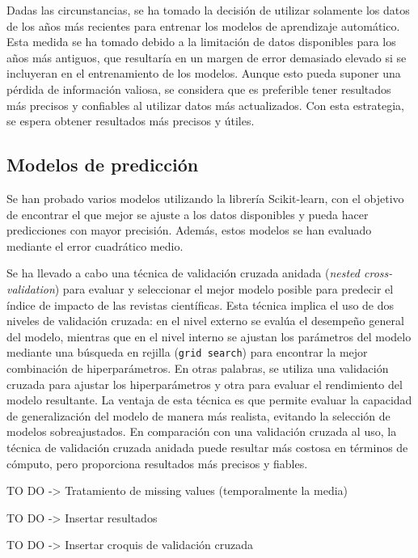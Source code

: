 Dadas las circunstancias, se ha tomado la decisión de utilizar solamente los datos de los años más recientes para entrenar los modelos de aprendizaje automático. Esta medida se ha tomado debido a la limitación de datos disponibles para los años más antiguos, que resultaría en un margen de error demasiado elevado si se incluyeran en el entrenamiento de los modelos. Aunque esto pueda suponer una pérdida de información valiosa, se considera que es preferible tener resultados más precisos y confiables al utilizar datos más actualizados. Con esta estrategia, se espera obtener resultados más precisos y útiles.

\subsection{Modelos de predicción}

Se han probado varios modelos utilizando la librería Scikit-learn, con el objetivo de encontrar el que mejor se ajuste a los datos disponibles y pueda hacer predicciones con mayor precisión. Además, estos modelos se han evaluado mediante el error cuadrático medio.

Se ha llevado a cabo una técnica de validación cruzada anidada (\textit{nested cross-validation}) para evaluar y seleccionar el mejor modelo posible para predecir el índice de impacto de las revistas científicas. Esta técnica implica el uso de dos niveles de validación cruzada: en el nivel externo se evalúa el desempeño general del modelo, mientras que en el nivel interno se ajustan los parámetros del modelo mediante una búsqueda en rejilla (\texttt{grid search}) para encontrar la mejor combinación de hiperparámetros. En otras palabras, se utiliza una validación cruzada para ajustar los hiperparámetros y otra para evaluar el rendimiento del modelo resultante. La ventaja de esta técnica es que permite evaluar la capacidad de generalización del modelo de manera más realista, evitando la selección de modelos sobreajustados. En comparación con una validación cruzada al uso, la técnica de validación cruzada anidada puede resultar más costosa en términos de cómputo, pero proporciona resultados más precisos y fiables.

TO DO -> Tratamiento de missing values (temporalmente la media)

TO DO -> Insertar resultados

TO DO -> Insertar croquis de validación cruzada
